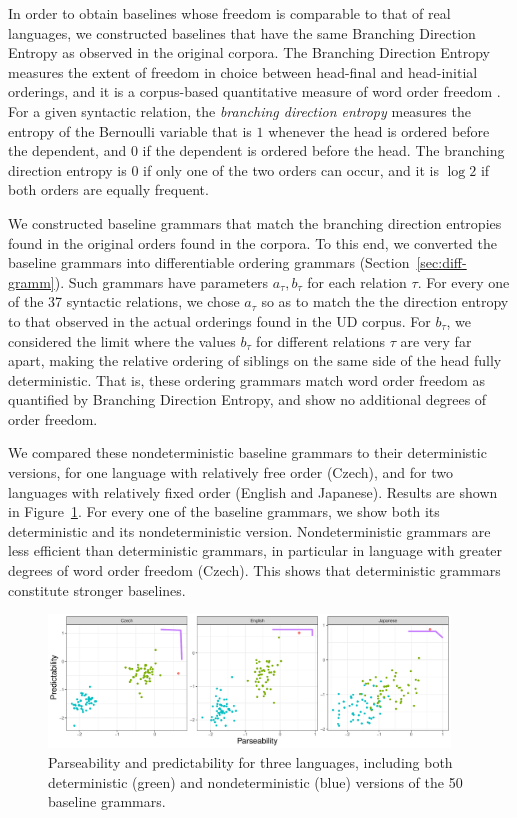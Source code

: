 \documentclass[10pt,twoside,lineno]{article}
\begin{document}
In order to obtain baselines whose freedom is comparable to that of real languages, we constructed baselines that have the same Branching Direction Entropy \cite{futrell2015quantifying} as observed in the original corpora.
The Branching Direction Entropy measures the extent of freedom in choice between head-final and head-initial orderings, and it is a corpus-based quantitative measure of word order freedom \cite{futrell2015quantifying}.
For a given syntactic relation, the \emph{branching direction entropy} measures the entropy of the Bernoulli variable that is $1$ whenever the head is ordered before the dependent, and $0$ if the dependent is ordered before the head.
The branching direction entropy is $0$ if only one of the two orders can occur, and it is $\log 2$ if both orders are equally frequent.

We constructed baseline grammars that match the branching direction entropies found in the original orders found in the corpora.
To this end, we converted the baseline grammars into differentiable ordering grammars (Section~\ref{sec:diff-gramm}).
Such grammars have parameters $a_\tau, b_\tau$ for each relation $\tau$.
For every one of the 37 syntactic relations, we chose $a_\tau$ so as to match the the direction entropy to that observed in the actual orderings found in the UD corpus.
For $b_\tau$, we considered the limit where the values $b_\tau$ for different relations $\tau$ are very far apart, making the relative ordering of siblings on the same side of the head fully deterministic.
That is, these ordering grammars match word order freedom as quantified by Branching Direction Entropy, and show no additional degrees of order freedom.

We compared these nondeterministic baseline grammars to their deterministic versions, for one language with relatively free order (Czech), and for two languages with relatively fixed order (English and Japanese).
Results are shown in Figure~\ref{fig:nondeterministic}.
For every one of the baseline grammars, we show both its deterministic and its nondeterministic version.
Nondeterministic grammars are less efficient than deterministic grammars, in particular in language with greater degrees of word order freedom (Czech).
This shows that deterministic grammars constitute stronger baselines.

\begin{figure}
	\centering
	\includegraphics[width=0.95\textwidth]{../results/plane/nondeterministic/pareto-plane-perLanguage-nondeterministic-mle.pdf}
	\caption{Parseability and predictability for three languages, including both deterministic (green) and nondeterministic  (blue) versions of the 50 baseline grammars.}\label{fig:nondeterministic}
\end{figure}
\end{document}
